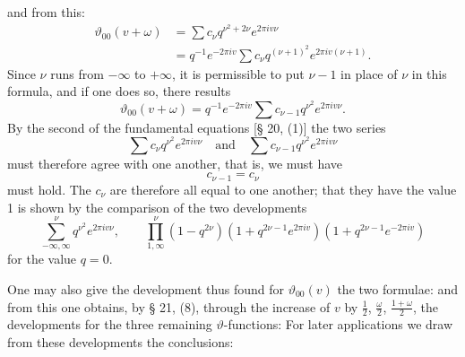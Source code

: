 and from this:
\[
\begin{aligned}
\vartheta_{00}(v+\omega) &= \sum c_\nu q^{\nu^2+2\nu} e^{2\pi i v \nu}\\
&=q^{-1}e^{-2\pi i v}\sum c_\nu q^{(\nu+1)^2}e^{2\pi i v(\nu+1)}.
\end{aligned}
\]
Since $\nu$ runs from $-\infty$ to $+\infty$, it is permissible to put $\nu - 1$
in place of $\nu$ in this formula, and if one does so, there results
\[
\vartheta_{00}(v+\omega) = q^{-1}e^{-2\pi i v}\sum c_{\nu-1} q^{\nu^2}e^{2\pi i v \nu}.
\]
By the second of the fundamental equations [§ 20, (1)] the two series
\[
\sum c_\nu q^{\nu^2}e^{2\pi i v \nu} \quad \text{and} \quad \sum c_{\nu-1} q^{\nu^2}e^{2\pi i v \nu}
\]
must therefore agree with one another, that is, we must have
\[
c_{\nu-1} = c_\nu
\]
must hold. The $c_\nu$ are therefore all equal to one another; that they have the value 1 is shown by the
comparison of the two developments
\[
\sum_{-\infty,\infty}^{\nu} q^{\nu^2}e^{2\pi i v \nu}, \qquad \prod_{1,\infty}^{\nu}(1 - q^{2\nu})(1 + q^{2\nu-1}e^{2\pi i v})(1 + q^{2\nu-1}e^{-2\pi i v})
\]
for the value $q = 0$.

One may also give the development thus found for $\vartheta_{00}(v)$ the two
formulae:
and from this one obtains, by § 21, (8), through the increase of $v$ by $\frac{1}{2}$,
$\frac{\omega}{2}$, $\frac{1+\omega}{2}$, the developments for the three remaining
$\vartheta$-functions:
For later applications we draw from these developments the conclusions:
